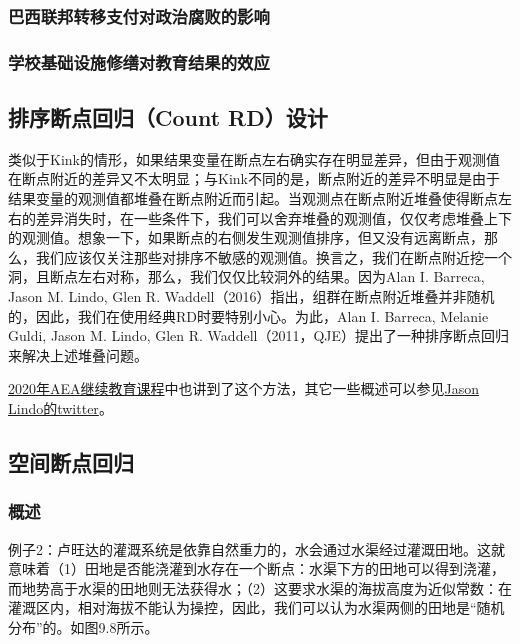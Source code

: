 \documentclass[cn,12pt,math=newtx,citestyle=gb7714-2015,bibstyle=gb7714-2015]{elegantbook}
\begin{document}
	
	\subsubsection{巴西联邦转移支付对政治腐败的影响}
	
	
	\subsubsection{学校基础设施修缮对教育结果的效应}
	

	\subsection{排序断点回归（Count RD）设计}
	
	类似于Kink的情形，如果结果变量在断点左右确实存在明显差异，但由于观测值在断点附近的差异又不太明显；与Kink不同的是，断点附近的差异不明显是由于结果变量的观测值都堆叠在断点附近而引起。当观测点在断点附近堆叠使得断点左右的差异消失时，在一些条件下，我们可以舍弃堆叠的观测值，仅仅考虑堆叠上下的观测值。想象一下，如果断点的右侧发生观测值排序，但又没有远离断点，那么，我们应该仅关注那些对排序不敏感的观测值。换言之，我们在断点附近挖一个洞，且断点左右对称，那么，我们仅仅比较洞外的结果。因为Alan I. Barreca, Jason M. Lindo, Glen R. Waddell（2016）指出，组群在断点附近堆叠并非随机的，因此，我们在使用经典RD时要特别小心。为此，Alan I. Barreca, Melanie Guldi, Jason M. Lindo, Glen R. Waddell（2011，QJE）提出了一种排序断点回归来解决上述堆叠问题。
	
   \href{https://www.aeaweb.org/conference/cont-ed/2020-webcasts}{2020年AEA继续教育课程}中也讲到了这个方法，其它一些概述可以参见\href{https://twitter.com/jasonmlindo/status/1240261010319118336?lang=en}{Jason Lindo的twitter}。
	
	
	\subsection{空间断点回归}
	
	\subsubsection{概述}
	
	
	例子2：卢旺达的灌溉系统是依靠自然重力的，水会通过水渠经过灌溉田地。这就意味着（1）田地是否能浇灌到水存在一个断点：水渠下方的田地可以得到浇灌，而地势高于水渠的田地则无法获得水；（2）这要求水渠的海拔高度为近似常数：在灌溉区内，相对海拔不能认为操控，因此，我们可以认为水渠两侧的田地是“随机分布”的。如图9.8所示。
	
\end{document}
